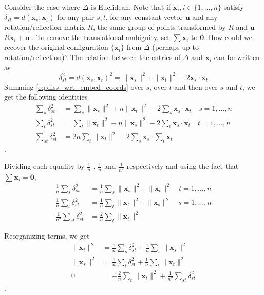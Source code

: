\documentclass[12pt,oneside,final]{thesis}\usepackage[]{graphicx}\usepackage[]{color}
\begin{document}
Consider the case where $\Delta$ is Euclidean. Note that if $\bm{x}_{i},i \in \{1,\ldots,n\} $ satisfy $\delta_{st}=d(\bm{x}_{s},\bm{x}_{t})$ for any pair $s,t$, for any constant vector $\bm{u}$ and any rotation/reflection matrix $R$, the same group  of points transformed by $R$ and   $\bm{u}$ $R\bm{x}_{i}+\bm{u}$ . To remove the translational ambiguity, set   $\sum{\bm{x}_{i}}$  to $\bm{0}$. How could we recover the original configuration   $\{\bm{x}_{i}\}$ from $\Delta$ (perhaps up to rotation/reflection)?
The relation between the entries of $\Delta$ and $\bm{x}_{i}$ can be written as
\[
\delta_{st}^2= d(\bm{x}_{s},\bm{x}_{t})^2 = \|\bm{x}_{s}   \|^2 +   \|\bm{x}_{t}   \|^2   -   2  \bm{x}_{s} \cdot  \bm{x}_{t}   
\label{eq:diss_wrt_embed_coords}
\]
Summing \eqref{eq:diss_wrt_embed_coords} over $s$, over $t$ and then over $s$ and $t$, we get the following identities
\begin{align}
\label{eq:diss_wrt_embed_coords_2_1}
\sum_s{ \delta_{st}^2} &= \sum_s{\| \bm{x}_{s}   \|^2} + n \|\bm{x}_{t}   \|^2 -2 \sum_s{ \bm{x}_{s}   \cdot\bm{x}_{t}    } \quad s=1,\ldots,n\\
\label{eq:diss_wrt_embed_coords_2_2}
\sum_t{ \delta_{st}^2} &= \sum_t{\| \bm{x}_{t}   \|^2} + n\|\bm{x}_{s}   \|^2  -2 \sum_t{ \bm{x}_{s}   \cdot\bm{x}_{t}   } \quad t=1,\ldots,n \\
\label{eq:diss_wrt_embed_coords_2_3}
\sum_{st}{ \delta_{st}^2} &= 2n\sum_{t}{\| \bm{x}_{t}   \|^2}  -2\sum_{s}{ \bm{x}_{s} } \cdot \sum_t{   \bm{x}_{t} }
\end{align}
.

Dividing each equality by $\frac{1}{n}$ , $\frac{1}{n}$ and $\frac{1}{n^2}$ respectively and using the fact that $\sum{\bm{x}_{i}}=\bm{0}$,
\begin{align}
\label{eq:diss_wrt_embed_coords_3_1}
\frac{1}{n}\sum_s{ \delta_{st}^2} &= \frac{1}{n}\sum_s{\|\bm{x}_{s}   \|^2 } +  \|\bm{x}_{t}   \|^2 \quad   t=1,\ldots,n\\
\label{eq:diss_wrt_embed_coords_3_2}
\frac{1}{n}\sum_t{ \delta_{st}^2} &= \frac{1}{n}\sum_t{\|\bm{x}_{t}   \|^2 }+  \|\bm{x}_{s}   \|^2 \quad   s=1,\ldots,n\\
\label{eq:diss_wrt_embed_coords_3_3}
\frac{1}{n^2}\sum_{st}{ \delta_{st}^2} &= \frac{2}{n}\sum_{t}{\|\bm{x}_{t}   \|^2} 
\end{align}

Reorganizing terms, we get
\begin{align}
\label{eq:diss_wrt_embed_coords_4_1}
\|\bm{x}_{t}   \|^2  &= \frac{1}{n}\sum_s{ \delta_{st}^2} + \frac{1}{n}\sum_s{\|\bm{x}_{s}   \|^2   } \\
\label{eq:diss_wrt_embed_coords_4_2}
\|\bm{x}_{s}   \|^2  &= \frac{1}{n}\sum_t{ \delta_{st}^2} + \frac{1}{n}\sum_t{\|\bm{x}_{t}   \|^2  }\\
\label{eq:diss_wrt_embed_coords_4_3}
0 &= -\frac{2}{n}\sum_{t}{\|\bm{x}_{t}   \|^2} +\frac{1}{n^2}\sum_{st}{ \delta_{st}^2} 
\end{align} .
\end{document}
